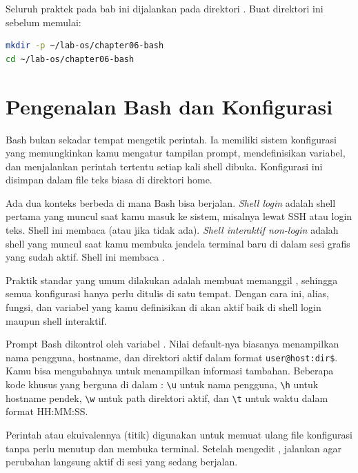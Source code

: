 \begin{notebox}
Seluruh praktek pada bab ini dijalankan pada direktori
.
Buat direktori ini sebelum memulai:
\begin{lstlisting}[language=bash]
mkdir -p ~/lab-os/chapter06-bash
cd ~/lab-os/chapter06-bash
\end{lstlisting}
\end{notebox}

\section{Pengenalan Bash dan Konfigurasi}
\label{sec:pengenalan-bash-konfigurasi}

Bash bukan sekadar tempat mengetik perintah. Ia memiliki sistem
konfigurasi yang memungkinkan kamu mengatur tampilan prompt, mendefinisikan
variabel, dan menjalankan perintah tertentu setiap kali shell dibuka.
Konfigurasi ini disimpan dalam file teks biasa di direktori home.

Ada dua konteks berbeda di mana Bash bisa berjalan. \textit{Shell login}
adalah shell pertama yang muncul saat kamu masuk ke sistem, misalnya
lewat SSH atau login teks. Shell ini membaca  (atau
 jika  tidak ada). \textit{Shell
interaktif non-login} adalah shell yang muncul saat kamu membuka jendela
terminal baru di dalam sesi grafis yang sudah aktif. Shell ini membaca
.

Praktik standar yang umum dilakukan adalah membuat 
memanggil , sehingga semua konfigurasi hanya perlu ditulis
di satu tempat. Dengan cara ini, alias, fungsi, dan variabel yang kamu
definisikan di  akan aktif baik di shell login maupun
shell interaktif.

Prompt Bash dikontrol oleh variabel . Nilai default-nya biasanya
menampilkan nama pengguna, hostname, dan direktori aktif dalam format
\texttt{user@host:dir\$}. Kamu bisa mengubahnya untuk menampilkan informasi
tambahan. Beberapa kode khusus yang berguna di dalam :
\texttt{\textbackslash u} untuk nama pengguna, \texttt{\textbackslash h}
untuk hostname pendek, \texttt{\textbackslash w} untuk path direktori aktif,
dan \texttt{\textbackslash t} untuk waktu dalam format HH:MM:SS.

Perintah  atau ekuivalennya  (titik) digunakan untuk
memuat ulang file konfigurasi tanpa perlu menutup dan membuka terminal.
Setelah mengedit , jalankan  agar
perubahan langsung aktif di sesi yang sedang berjalan.

